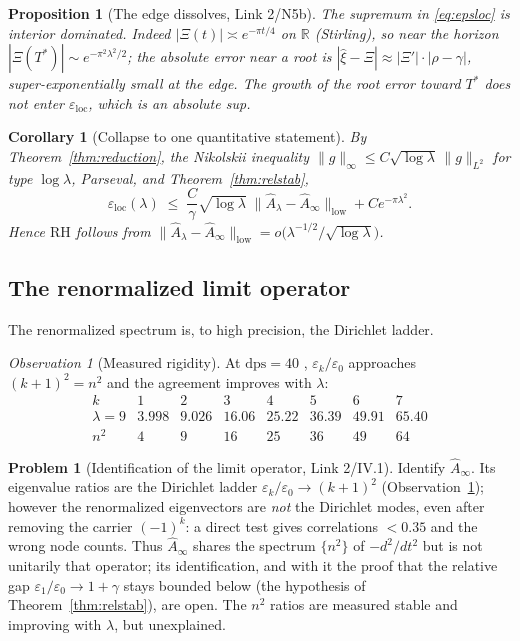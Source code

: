 \documentclass[11pt]{amsart}
\newtheorem{proposition}[theorem]{Proposition}
\newtheorem{corollary}[theorem]{Corollary}
\theoremstyle{definition}
\newtheorem{problem}[theorem]{Problem}
\theoremstyle{remark}
\newtheorem{observation}[theorem]{Observation}
\newcommand{\RH}{\mathrm{RH}}
\newcommand{\bbR}{\mathbb{R}}
\newcommand{\xih}{\widehat{\xi}}
\newcommand{\Ah}{\widehat{A}}
\begin{document}
\begin{proposition}[The edge dissolves, Link 2/N5b]\label{prop:edge}
The supremum in \eqref{eq:epsloc} is interior dominated. Indeed
$|\Xi(t)|\asymp e^{-\pi t/4}$ on $\bbR$ (Stirling), so near the horizon
$|\Xi(T^\ast)|\sim e^{-\pi^2\lambda^2/2}$; the absolute error near a root is
$|\xih-\Xi|\approx|\Xi'|\cdot|\rho-\gamma|$, super-exponentially small at the
edge. The growth of the \emph{root} error toward $T^\ast$ does not enter
$\varepsilon_{\mathrm{loc}}$, which is an \emph{absolute} sup.
\end{proposition}

\begin{corollary}[Collapse to one quantitative statement]\label{cor:collapse}
By Theorem~\ref{thm:reduction}, the Nikolskii inequality
$\|g\|_\infty\leq C\sqrt{\log\lambda}\,\|g\|_{L^2}$ for type $\log\lambda$,
Parseval, and Theorem~\ref{thm:relstab},
\begin{equation}\label{eq:collapse}
\varepsilon_{\mathrm{loc}}(\lambda)\;\leq\;
\frac{C}{\gamma}\sqrt{\log\lambda}\;\|\Ah_\lambda-\Ah_\infty\|_{\mathrm{low}}
+Ce^{-\pi\lambda^2}.
\end{equation}
Hence $\RH$ follows from
$\|\Ah_\lambda-\Ah_\infty\|_{\mathrm{low}}=o\!\big(\lambda^{-1/2}/
\sqrt{\log\lambda}\big)$.
\end{corollary}

\subsection{The renormalized limit operator}\label{ssec:limit}
The renormalized spectrum is, to high precision, the Dirichlet ladder.

\begin{observation}[Measured rigidity]\label{obs:n2}
At $\mathrm{dps}=40$ \cite{Pccm}, $\varepsilon_k/\varepsilon_0$ approaches
$(k+1)^2=n^2$ and the agreement improves with $\lambda$:
\[
\begin{array}{c|ccccccc}
k & 1 & 2 & 3 & 4 & 5 & 6 & 7\\\hline
\lambda=9 & 3.998 & 9.026 & 16.06 & 25.22 & 36.39 & 49.91 & 65.40\\
n^2 & 4 & 9 & 16 & 25 & 36 & 49 & 64
\end{array}
\]
\end{observation}

\begin{problem}[Identification of the limit operator, Link 2/IV.1]
\label{prob:limitop}
Identify $\Ah_\infty$. Its eigenvalue ratios are the Dirichlet ladder
$\varepsilon_k/\varepsilon_0\to(k+1)^2$ (Observation~\ref{obs:n2}); however
the renormalized eigenvectors are \emph{not} the Dirichlet modes, even after
removing the carrier $(-1)^k$: a direct test \cite{Pccm} gives correlations
$<0.35$ and the wrong node counts. Thus $\Ah_\infty$ shares the spectrum
$\{n^2\}$ of $-d^2/dt^2$ but is not unitarily that operator; its
identification, and with it the proof that the relative gap
$\varepsilon_1/\varepsilon_0\to1+\gamma$ stays bounded below (the hypothesis
of Theorem~\ref{thm:relstab}), are open. The $n^2$ ratios are measured stable
and improving with $\lambda$, but unexplained.
\end{problem}
\end{document}
